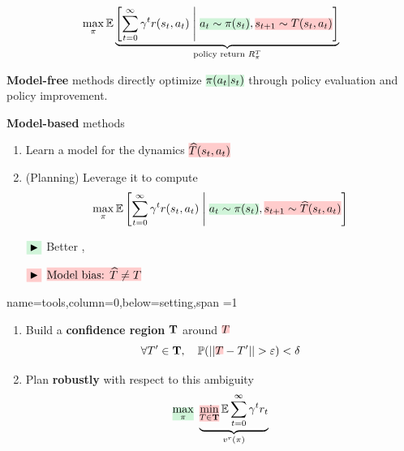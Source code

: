 \documentclass[paperwidth=36in, paperheight=48in,portrait,fontscale=0.35, margin=2cm]{baposter}
\begin{document}
\begin{poster}
{    \begin{equation}
        \max_\pi \expectedvalue \underbrace{\left[\sum_{t=0}^\infty \gamma^t r(s_t, a_t) \condbar \hleg{a_t\sim\pi(s_t)}, \hler{s_{t+1}\sim T(s_t, a_t)}\right]}_{\text{policy return }R^T_\pi}
    \end{equation}
    
    \textbf{Model-free} methods directly optimize $\hleg{\pi(a_t | s_t)}$ through policy evaluation and policy improvement.
    \vspace{1em}

    \textbf{Model-based} methods
    \begin{enumerate}[itemsep=0pt]
        \item Learn a model for the dynamics $\hler{\hat{T}(s_t, a_t)}$
        \item (Planning) Leverage it to compute
        \begin{equation*}
        \max_\pi \expectedvalue \left[\sum_{t=0}^\infty \gamma^t r(s_t, a_t) \condbar \hleg{a_t\sim\pi(s_t)}, \hler{s_{t+1}\sim \hat{T}(s_t, a_t)}\right]
        \end{equation*}
    \end{enumerate}


    \begin{itemize}[nolistsep]
        \item[$\eqgcolb{\blacktriangleright}$] Better , 
        \item[$\eqrcolb{\blacktriangleright}$] $\hler{\text{Model bias: }\hat{T} \neq T}$
    \end{itemize}

}

{name=tools,column=0,below=setting,span =1}
{
\begin{enumerate}[nolistsep]
    \item Build a \textbf{confidence region} $\mathbf{T}$ around $\hler{T}$
    \begin{equation*}
    \forall T'\in \bT, \quad \probability(||\hler{T} - T'|| > \epsilon) < \delta
    \end{equation*}
    \item Plan \textbf{robustly} with respect to this ambiguity
    \begin{equation}
        \hleg{\max_{\pi}}\ \underbrace{\hler{\min_{T\in \bT}} \expectedvalue \sum_{t=0}^\infty \gamma^t r_t}_{v^r(\pi)} 
    \end{equation}
\end{enumerate}

}
\end{poster}
\end{document}
